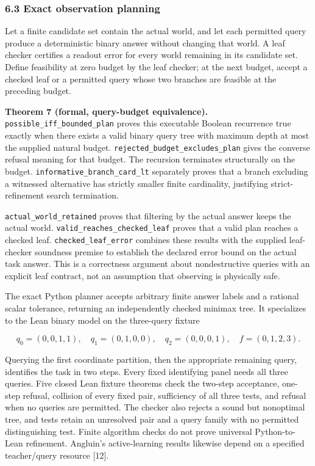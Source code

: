 \documentclass[
  10pt,
]{article}
\begin{document}
\subsubsection{6.3 Exact observation planning}\label{exact-observation-planning}

Let a finite candidate set contain the actual world, and let each permitted query produce a deterministic binary answer without changing that world. A leaf checker certifies a readout error for every world remaining in its candidate set. Define feasibility at zero budget by the leaf checker; at the next budget, accept a checked leaf or a permitted query whose two branches are feasible at the preceding budget.

\textbf{Theorem 7 (formal, query-budget equivalence).} \texttt{possible\_iff\_bounded\_plan} proves this executable Boolean recurrence true exactly when there exists a valid binary query tree with maximum depth at most the supplied natural budget. \texttt{rejected\_budget\_excludes\_plan} gives the converse refusal meaning for that budget. The recursion terminates structurally on the budget. \texttt{informative\_branch\_card\_lt} separately proves that a branch excluding a witnessed alternative has strictly smaller finite cardinality, justifying strict-refinement search termination.

\texttt{actual\_world\_retained} proves that filtering by the actual answer keeps the actual world. \texttt{valid\_reaches\_checked\_leaf} proves that a valid plan reaches a checked leaf. \texttt{checked\_leaf\_error} combines these results with the supplied leaf-checker soundness premise to establish the declared error bound on the actual task answer. This is a correctness argument about nondestructive queries with an explicit leaf contract, not an assumption that observing is physically safe.

The exact Python planner accepts arbitrary finite answer labels and a rational scalar tolerance, returning an independently checked minimax tree. It specializes to the Lean binary model on the three-query fixture

\protect\hypertarget{math-E0048-0050}{}{\[
q_0=(0,0,1,1),\quad q_1=(0,1,0,0),\quad
q_2=(0,0,0,1),\quad f=(0,1,2,3).
\]}

Querying the first coordinate partition, then the appropriate remaining query, identifies the task in two steps. Every fixed identifying panel needs all three queries. Five closed Lean fixture theorems check the two-step acceptance, one-step refusal, collision of every fixed pair, sufficiency of all three tests, and refusal when no queries are permitted. The checker also rejects a sound but nonoptimal tree, and tests retain an unresolved pair and a query family with no permitted distinguishing test. Finite algorithm checks do not prove universal Python-to-Lean refinement. Angluin's active-learning results likewise depend on a specified teacher/query resource {[}12{]}.
\end{document}
